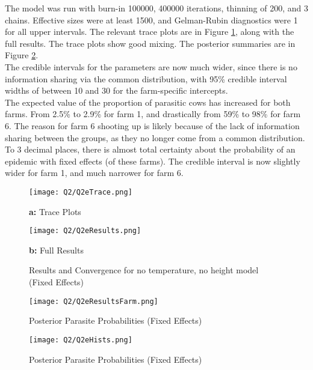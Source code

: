 \documentclass[11pt]{article}
\begin{document}
\vspace{-3mm}

The model was run with burn-in 100000, 400000 iterations, thinning of 200, and 3 chains. Effective sizes were at least 1500, and Gelman-Rubin diagnostics were 1 for all upper intervals. The relevant trace plots are in Figure \ref{Fig::2eTraceResults}, along with the full results. The trace plots show good mixing. The posterior summaries are in Figure \ref{Fig::2eResultsFARM}.\\
 The credible intervals for the parameters are now much wider, since there is no information sharing via the common distribution, with 95\% credible interval widths of between 10 and 30 for the farm-specific intercepts. \\
The expected value of the proportion of parasitic cows has increased for both farms. From 2.5\% to 2.9\% for farm 1, and drastically from 59\% to 98\% for farm 6. The reason for farm 6 shooting up is likely because of the lack of information sharing between the groups, as they no longer come from a common distribution. To 3 decimal places, there is almost total certainty about the probability of an epidemic with fixed effects (of these farms). The credible interval is now slightly wider for farm 1, and much narrower for farm 6. 

\begin{figure}[!h]
    \begin{minipage}[l]{0.5\textwidth}
        \texttt{[image: Q2/Q2eTrace.png]}
        \centerline{\textbf{a:} Trace Plots}
    \end{minipage}
    \begin{minipage}[pos=r]{0.5\textwidth}
        \texttt{[image: Q2/Q2eResults.png]}
        \centerline{\textbf{b:} Full Results}
    \end{minipage}
\caption{Results and Convergence for no temperature, no height model (Fixed Effects)} \label{Fig::2eTraceResults}
\end{figure}


\begin{figure}[!h]
\centering
\texttt{[image: Q2/Q2eResultsFarm.png]}
\caption{Posterior Parasite Probabilities (Fixed Effects)} \label{Fig::2eResultsFARM}
\end{figure}

\begin{figure}[!h]
\centering
\texttt{[image: Q2/Q2eHists.png]}
\caption{Posterior Parasite Probabilities (Fixed Effects)} \label{Fig::2eHists} 
\end{figure}
\end{document}
